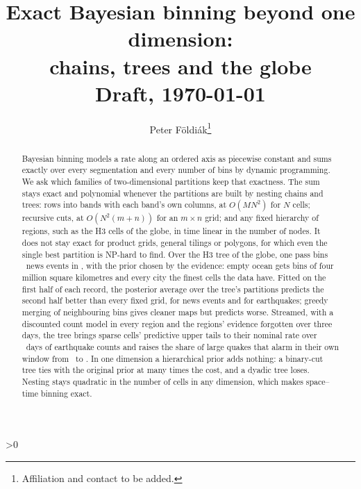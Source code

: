 \documentclass[11pt,a4paper]{article}
\title{Exact Bayesian binning beyond one dimension:\\chains, trees and the globe\\[0.4em]
  \large Draft, \today}
\author{Peter F\"oldi\'ak\thanks{Affiliation and contact to be added.}}
\date{}
\begin{document}
\maketitle

\begin{abstract}
Bayesian binning models a rate along an ordered axis as piecewise constant and sums exactly
over every segmentation and every number of bins by dynamic programming. We ask which families of
two-dimensional partitions keep that exactness. The sum stays exact and polynomial whenever the
partitions are built by nesting chains and trees: rows into bands with each band's own columns, at
$O(M N^2)$ for $N$ cells; recursive cuts, at $O(N^2(m+n))$ for an $m \times n$ grid; and any fixed
hierarchy of regions, such as the H3 cells of the globe, in time linear in the number of nodes. It
does not stay exact for product grids, general tilings or polygons, for which even the single best
partition is NP-hard to find. Over the H3 tree of the globe, one pass bins \newsEvents\ news events
in \newsPass, with the prior chosen by the evidence: empty ocean gets bins of four million
square kilometres and every city the finest cells the data have. Fitted on the first half of each
record, the posterior average over the tree's partitions predicts the second half better than every
fixed grid, for news events and for earthquakes; greedy merging of neighbouring bins gives cleaner
maps but predicts worse. Streamed, with a discounted count model in every region and the regions'
evidence forgotten over three days, the tree brings sparse cells' predictive upper tails to their
nominal rate over \streamDays\ days of earthquake counts and raises the share of large quakes that
alarm in their own window from \streamBigAlonePct\ to \streamBigTreePct. In one dimension a hierarchical
prior adds nothing: a binary-cut tree ties
with the original prior at many times the cost, and a dyadic tree loses. Nesting stays quadratic in
the number of cells in any dimension, which makes space--time binning exact.
\end{abstract}

\ifnum\claimcount>0
\begin{center}
\end{center}
\fi
\end{document}
